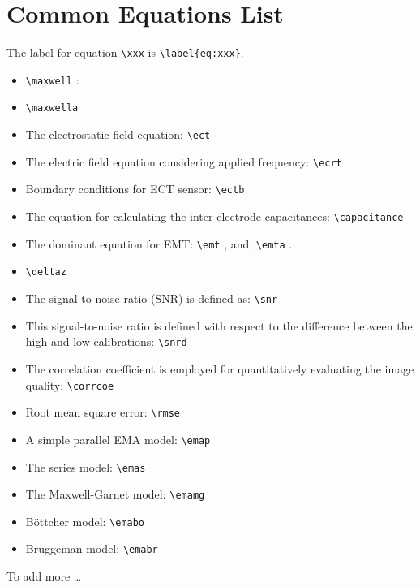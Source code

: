 
\appendices
\section{Common Equations List}

The label for  equation \verb+\xxx+ is \verb+\label{eq:xxx}+.

\begin{itemize}
  \item \verb+\maxwell+ : 
  \maxwell
  \item \verb+\maxwella+ 
  \maxwella
  \item The electrostatic field equation: \verb+\ect+
   \ect
  \item The electric field equation considering applied frequency: \verb+\ecrt+
  \ecrt
  \item Boundary conditions for ECT sensor: \verb+\ectb+
  \ectb
  \item The equation for calculating the inter-electrode capacitances: \verb+\capacitance+
  \capacitance
  \item The dominant equation for EMT: \verb+\emt+
  \emt,
  and, \verb+\emta+
  \emta.
  \item \verb+\deltaz+
  \deltaz
  \item The signal-to-noise ratio (SNR) is defined as: \verb+\snr+
  \snr
  \item This signal-to-noise ratio is defined with respect to the difference between the high and low calibrations: \verb+\snrd+
  \snrd
  \item The correlation coefficient is employed for quantitatively evaluating the image quality: \verb+\corrcoe+
  \corrcoe
  \item Root mean square error: \verb+\rmse+
  \rmse
  \item A simple parallel EMA model: \verb+\emap+
  \emap
  \item The series model: \verb+\emas+
  \emas
  \item The Maxwell-Garnet model: \verb+\emamg+
  \emamg
  \item B\"{o}ttcher model: \verb+\emabo+
  \emabo
  \item Bruggeman model: \verb+\emabr+
  \emabr









\end{itemize}
 To add more \dots